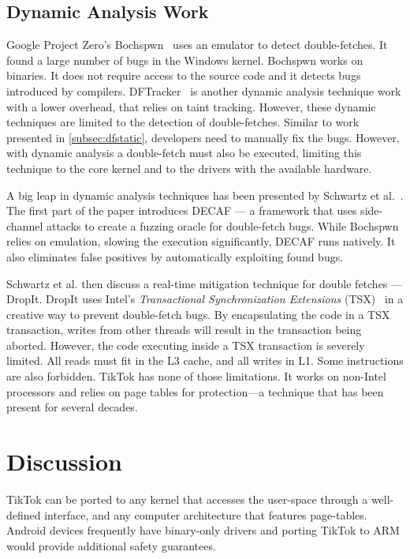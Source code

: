 \documentclass[conference]{IEEEtran}
\newcommand{\sysname}{TikTok}
\begin{document}
\subsection{Dynamic Analysis Work}
\label{subsec:dfdynamic}
Google Project Zero's Bochspwn~\cite{jurczyk2013bochspwn} uses an emulator to
detect double-fetches. It found a large number of bugs in the Windows kernel.
Bochspwn works on binaries. It does not require access to the source code and it
detects bugs introduced by compilers. DFTracker~\cite{wang2019dftracker} is
another dynamic analysis technique work with a lower overhead, that relies on
taint tracking. However, these dynamic techniques are limited to the detection
of double-fetches. Similar to work presented in \autoref{subsec:dfstatic},
developers need to manually fix the bugs. However, with dynamic analysis a
double-fetch must also be executed, limiting this technique to the core kernel
and to the drivers with the available hardware.

A big leap in dynamic analysis techniques has been presented by Schwartz et
al.~\cite{schwarz2018automated}. The first part of the paper introduces DECAF
--- a framework that uses side-channel attacks to create a fuzzing oracle for
double-fetch bugs. While Bochspwn relies on emulation, slowing the execution
significantly, DECAF runs natively. It also eliminates false positives by
automatically exploiting found bugs.

Schwartz et al. then discuss a real-time mitigation technique for double fetches
--- DropIt. DropIt uses Intel's \emph{Transactional Synchronization Extensions}
(TSX)~\cite{intel64and} in a creative way to prevent double-fetch bugs. By
encapsulating the code in a TSX transaction, writes from other threads will
result in the transaction being aborted. However, the code executing inside a
TSX transaction is severely limited. All reads must fit in the L3 cache, and all
writes in L1. Some instructions are also forbidden. \sysname{} has none of those
limitations. It works on non-Intel processors and relies on page tables for
protection---a technique that has been present for several decades.

\section{Discussion}
\label{sec:discussion}
\sysname{} can be ported to any kernel that accesses the user-space through a
well-defined interface, and any computer architecture that features page-tables.
Android devices frequently have binary-only drivers and porting \sysname{} to 
ARM would provide additional safety guarantees.
\end{document}
